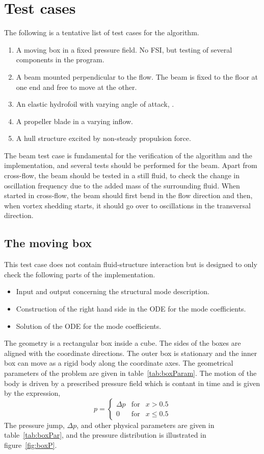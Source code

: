 \section{Test cases} \label{sec:tests}

The following is a tentative list of test cases for the algorithm.
\begin{enumerate}
\item A moving box in a fixed pressure field. No FSI, but testing
of several components in the program.
\item A beam mounted perpendicular to the flow. The beam is fixed to
the floor at one end and free to move at the other.
\item An elastic hydrofoil with varying angle of attack, \cite{DY:1}.
\item A propeller blade in a varying inflow.
\item A hull structure excited by non-steady propulsion force.
\end{enumerate}

The beam test case is fundamental for the verification of the
algorithm and the implementation, and several tests should be
performed for the beam. Apart from cross-flow, the beam should
be tested in a still fluid, to check the change in oscillation
frequency due to the added mass of the surrounding fluid.
When started in cross-flow, the beam should first bend in the flow
direction and then, when vortex shedding starts, it should go
over to oscillations in the transversal direction.

%
%
\subsection{The moving box}

This test case does not contain fluid-structure interaction but
is designed to only check the following parts of the implementation.
\begin{itemize}
\item Input and output concerning the structural mode description.
\item Construction of the right hand side in the ODE for the mode coefficients.
\item Solution of the ODE for the mode coefficients.
\end{itemize}

The geometry is a rectangular box inside a cube.
The sides of the boxes are aligned with the coordinate directions.
The outer box is stationary and the inner
box can move as a rigid body along the coordinate axes.
The geometrical parameters of the problem are given in table~\ref{tab:boxParam}.
The motion of the body is driven by a prescribed pressure field which is contant
in time and is given by the expression,
\[
p=\left\{\begin{array}{lll}
\Delta p & \mbox{for} & x>0.5 \\
0 & \mbox{for} & x \leq 0.5
\end{array}\right.
\]
The pressure jump, $\Delta p$, and other physical parameters are given in
table~\ref{tab:boxPar}, and the pressure distribution is illustrated in 
figure~\ref{fig:boxP}.

